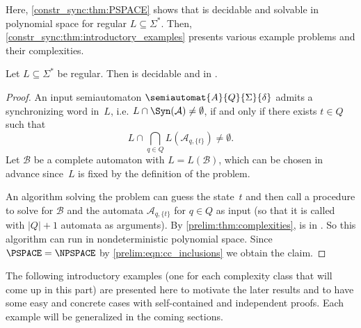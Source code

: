 
Here, \cref{constr_sync:thm:PSPACE} shows that  
is decidable and solvable in polynomial space for regular $L \subseteq \Sigma^*$.
Then, \cref{constr_sync:thm:introductory_examples} 
presents various example problems and their complexities.

\begin{theorem}
	\label{constr_sync:thm:PSPACE}
	Let $L \subseteq \Sigma^*$ be regular.
	Then  is decidable and in \PSPACE.
\end{theorem}
\begin{proof}
	An input semiautomaton $\semiautomat{A}{Q}{\Sigma}{\delta}$
	admits a synchronizing word in~$L$, i.e. $L \cap \Syn(\mathcal A) \ne \emptyset$,
	if and only if there exists $t \in Q$ such that
	\[  
	L \cap \bigcap_{q \in Q} L(\mathcal A_{q, \{t\}}) \ne \emptyset.
	\]
	Let $\mathcal B$ be a complete automaton 
	with $L = L(\mathcal B)$, which can be chosen in advance
	since~$L$ is fixed by the definition of the problem.
	
	An algorithm solving the problem
	can guess the state~$t$
	and then call a procedure
	to solve \DFAINT for $\mathcal B$
	and the automata 
	$\mathcal A_{q, \{t\}}$ for $q \in Q$
	as input (so that it is called with $|Q|+1$ automata as arguments).
	By \cref{prelim:thm:complexities},
	\DFAINT is in \PSPACE.
	So this algorithm can run in nondeterministic polynomial space.
	Since $\PSPACE = \NPSPACE$ 
	by \cref{prelim:eqn:cc_inclusions}
	we obtain the claim.
\end{proof}

The following introductory examples (one for each complexity class that will come up in this part)
are presented here to motivate the later results and to have some easy and concrete cases
with self-contained and independent proofs. Each example will be generalized in the coming sections.

